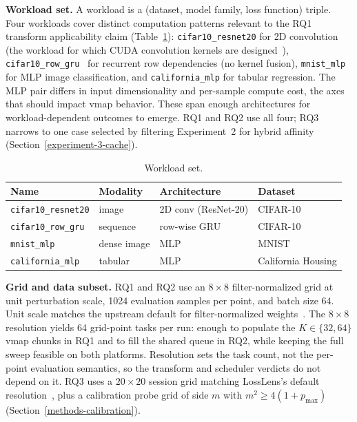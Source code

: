 \textbf{Workload set.} A workload is a (dataset, model family, loss function) triple. Four workloads cover
distinct computation patterns relevant to the RQ1 transform
applicability claim (Table~\ref{tab:workloads}):
\texttt{cifar10\_resnet20} for 2D convolution (the
workload for which CUDA convolution kernels are
designed~\cite{nvidia_cudnn_convolution_guide}),
\texttt{cifar10\_row\_gru}~\cite{cho2014gru,chung2014gru}
for recurrent row dependencies (no kernel fusion),
\texttt{mnist\_mlp} for MLP image classification, and
\texttt{california\_mlp} for
tabular regression. The MLP pair differs in input dimensionality and
per-sample compute cost, the axes that should impact vmap behavior. 
These span enough architectures
for workload-dependent outcomes to emerge. RQ1 and RQ2 use
all four; RQ3 narrows to one case selected by filtering
Experiment~2 for hybrid affinity
(Section~\ref{experiment-3-cache}).

\begin{table}[t]
  \caption{Workload set.}
  \label{tab:workloads}
  \centering
  \begin{tabular}{llll}
    \toprule
    Name & Modality & Architecture & Dataset \\
    \midrule
    \texttt{cifar10\_resnet20} & image & 2D conv (ResNet-20) & CIFAR-10 \\
    \texttt{cifar10\_row\_gru} & sequence & row-wise GRU & CIFAR-10 \\
    \texttt{mnist\_mlp} & dense image & MLP & MNIST \\
    \texttt{california\_mlp} & tabular & MLP & California Housing \\
    \bottomrule
  \end{tabular}
\end{table}

\textbf{Grid and data subset.} RQ1 and RQ2 use an
$8\times 8$ filter-normalized grid at unit perturbation
scale, 1024 evaluation samples per point, and batch size
$64$. Unit scale matches the upstream default for
filter-normalized
weights~\cite{li2018losslandscape,goldstein_loss_landscape_repo}.
The $8\times 8$ resolution yields 64 grid-point tasks per
run: enough to populate the $K\in\{32,64\}$ vmap chunks in
RQ1 and to fill the shared queue in RQ2, while keeping the
full sweep feasible on both platforms. Resolution sets the
task count, not the per-point evaluation semantics, so the
transform and scheduler verdicts do not depend on it. RQ3 uses a
$20\times 20$ session grid matching LossLens's default
resolution~\cite{xie2025losslens}, plus a calibration probe
grid of side $m$ with $m^2\ge 4(1+p_{\max})$
(Section~\ref{methods-calibration}).

